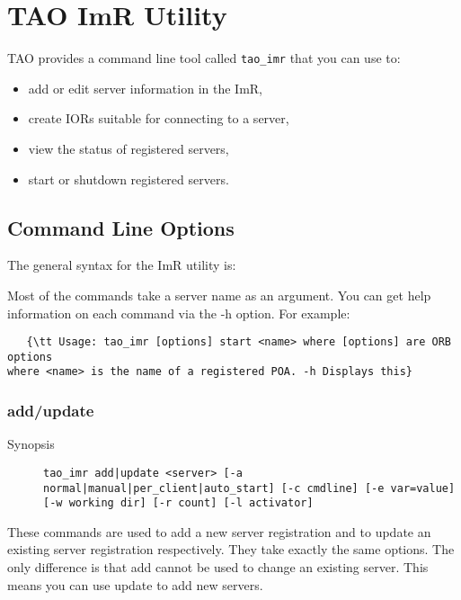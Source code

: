 \section{TAO ImR Utility}
\label{taoimrutil}

TAO provides a command line tool called {\tt tao\_imr} that you can use to:

\begin{itemize}
    \item add or edit server information in the ImR,
    \item create IORs suitable for connecting to a server,
    \item view the status of registered servers,
    \item start or shutdown registered servers.
\end{itemize}

\subsection{Command Line Options}

The general syntax for the ImR utility is:


Most of the commands take a server name as an argument. You can get help
information on each command via the -h option. For example:


\begin{verbatim}
   {\tt Usage: tao_imr [options] start <name> where [options] are ORB options
where <name> is the name of a registered POA. -h Displays this}
\end{verbatim}

\subsubsection{add/update}

\begin{description}
    \item [Synopsis] {\tt tao\_imr add|update <server>
                 [-a normal|manual|per\_client|auto\_start] [-c cmdline]
                 [-e var=value] [-w working dir] [-r count] [-l activator]}
\end{description}

These commands are used to add a new server registration and to update
an existing server registration respectively. They take exactly the same
options. The only difference is that add cannot be used to change an
existing server. This means you can use update to add new servers.

